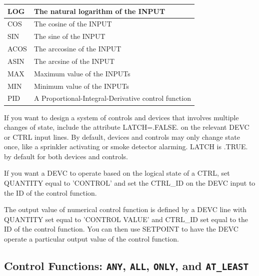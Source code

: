 \documentclass[11pt]{book}
\begin{document}
\begin{table}[h!]
\begin{center}
\begin{tabular}{|l||l|}
{\ct LOG}                         & The natural logarithm of the {\ct INPUT} \\ \hline
{\ct COS}                         & The cosine of the {\ct INPUT} \\ \hline
{\ct SIN}                         & The sine of the {\ct INPUT} \\ \hline
{\ct ACOS}                        & The arccosine of the {\ct INPUT} \\ \hline
{\ct ASIN}                        & The arcsine of the {\ct INPUT} \\ \hline
{\ct MAX}                         & Maximum value of the {\ct INPUT}s \\ \hline
{\ct MIN}                         & Minimum value of the {\ct INPUT}s \\ \hline
{\ct PID}                         & A Proportional-Integral-Derivative control function \\ \hline
\end{tabular}
\end{center}
\end{table}

If you want to design a system of controls and devices that involves multiple changes of state, include the attribute {\ct LATCH=.FALSE.} on the relevant {\ct DEVC} or {\ct CTRL} input lines. By default, devices and controls may only change state once, like a sprinkler activating or smoke detector alarming. {\ct LATCH} is {\ct .TRUE.} by default for both devices and controls.

If you want a {\ct DEVC} to operate based on the logical state of a {\ct CTRL}, set {\ct QUANTITY} equal to {\ct 'CONTROL'} and set the {\ct CTRL\_ID} on the {\ct DEVC} input to the {\ct ID} of the control function.

The output value of numerical control function is defined by a {\ct DEVC} line with {\ct QUANTITY} set equal to {\ct 'CONTROL VALUE'} and {\ct CTRL\_ID} set equal to the {\ct ID} of the control function.  You can then use {\ct SETPOINT} to have the {\ct DEVC} operate a particular output value of the control function.


\subsection{Control Functions: \texorpdfstring{{\tt ANY}}{ANY}, \texorpdfstring{{\tt ALL}}{ALL}, \texorpdfstring{{\tt ONLY}}{ONLY}, and
\texorpdfstring{{\tt AT\_LEAST}}{AT\_LEAST}}

\label{info:FUNCTION_TYPE}
\end{document}
